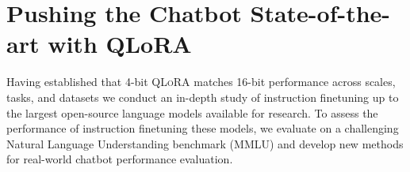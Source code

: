 \begin{table}[]
\centering
\caption{Mean 5-shot MMLU test accuracy for LLaMA 7-65B models finetuned with adapters on Alpaca and FLAN v2 for different data types. Overall, NF4 with double quantization (DQ) matches BFloat16 performance, while FP4 is consistently one percentage point behind both.}
\label{tbl:llama-datatype}
\end{table}

\section{Pushing the Chatbot State-of-the-art with QLoRA}
\label{sec:pushing}
Having established that 4-bit \textsc{QLoRA} matches 16-bit performance across scales, tasks, and datasets we conduct an in-depth study of instruction finetuning up to the largest open-source language models available for research. To assess the performance of instruction finetuning these models, we evaluate on a challenging Natural Language Understanding benchmark (MMLU) and develop new methods for real-world  chatbot performance evaluation. 

